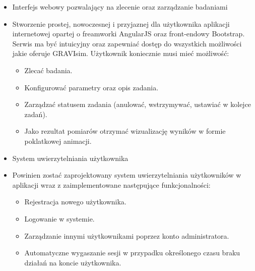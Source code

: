 \documentclass[a4paper,onecolumn,oneside,12pt]{memoir}
\begin{document}
{\vspace*{1mm}
\begin{itemize}\bfseries
\item Interfejs webowy pozwalający na zlecenie oraz zarządzanie badaniami
\end{itemize}
\begin{itemize}
\item[] Stworzenie prostej, nowoczesnej i przyjaznej dla użytkownika aplikacji internetowej opartej o freamworki AngularJS oraz front-endowy Bootstrap. Serwis ma być intuicyjny oraz zapewniać dostęp do wszystkich możliwości jakie oferuje GRAVIsim. Użytkownik koniecznie musi mieć możliwość:

\begin{itemize}[leftmargin=+8mm]
\item Zlecać badania.
\item Konfigurować parametry oraz opis zadania.
\item Zarządzać statusem zadania (anulować, wstrzymywać, ustawiać w kolejce zadań).
\item Jako rezultat pomiarów otrzymać wizualizację wyników w formie poklatkowej animacji.
\end{itemize}

\end{itemize}

\begin{itemize}\bfseries
\item System uwierzytelniania użytkownika

\end{itemize}

\begin{itemize}
\item[] Powinien zostać zaprojektowany system uwierzytelniania użytkowników w aplikacji wraz z zaimplementowane następujące funkcjonalności:


\begin{itemize}[leftmargin=+8mm]
\item Rejestracja nowego użytkownika.
\item Logowanie w systemie.
\item Zarządzanie innymi użytkownikami poprzez konto administratora.
\item Automatyczne wygaszanie sesji w przypadku określonego czasu braku działań na koncie użytkownika.
\end{itemize}

\end{itemize}


}
\end{document}
